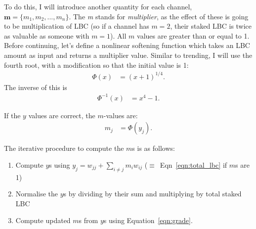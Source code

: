 \documentclass[a4paper, 12pt]{article}
\begin{document}
To do this, I will introduce another quantity for each channel,
$\boldsymbol{m} = \{m_1, m_2, ..., m_n\}$. The {\em m} stands for
{\em multiplier}, as the effect of these is going to be multiplication of LBC
(so if a channel has $m=2$, their staked LBC is twice as valuable as someone
with $m=1$). All $m$ values are greater than or equal to 1.
Before continuing, let's define a nonlinear softening function which takes
an LBC amount as input and returns a multiplier value. Similar to trending,
I will use the fourth root, with a modification so that the initial value
is 1:
\begin{align}
\Phi(x) &= (x + 1)^{1/4}.
\end{align}
The inverse of this is
\begin{align}
\Phi^{-1}(x) &= x^4 - 1.
\end{align}

If the $y$ values are correct, the $m$-values are:
\begin{align}
m_j &= \Phi(y_j). \label{eqn:grade}
\end{align}

The iterative procedure to compute the $m$s is as follows:
\begin{enumerate}
\item Compute $y$s using $y_j = w_{jj} + \sum_{i \neq j} m_i w_{ij}$ ($\equiv$~Eqn~\ref{eqn:total_lbc} if $m$s are 1)
\item Normalise the $y$s by dividing by their sum and multiplying by total staked LBC
\item Compute updated $m$s from $y$s using Equation~\ref{eqn:grade}.
\end{enumerate}



\end{document}
